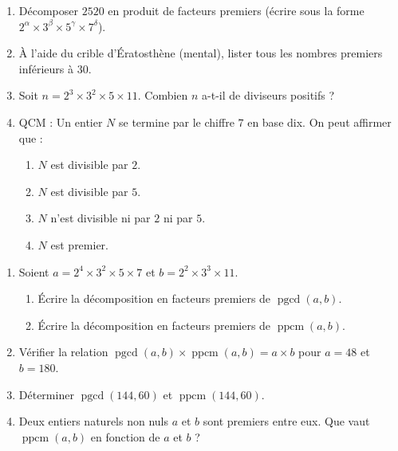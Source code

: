 \documentclass[11pt]{article}
\begin{document}
\begin{exercice}
\begin{enumerate}
    \item Décomposer $2520$ en produit de facteurs premiers (écrire sous la forme $2^\alpha \times 3^\beta \times 5^\gamma \times 7^\delta$).
    \item À l'aide du crible d'Ératosthène (mental), lister tous les nombres premiers inférieurs à $30$.
    \item Soit $n = 2^3 \times 3^2 \times 5 \times 11$. Combien $n$ a-t-il de diviseurs positifs ?
    \item QCM : Un entier $N$ se termine par le chiffre $7$ en base dix. On peut affirmer que :
    \begin{enumerate}
        \item $N$ est divisible par $2$.
        \item $N$ est divisible par $5$.
        \item $N$ n'est divisible ni par $2$ ni par $5$.
        \item $N$ est premier.
    \end{enumerate}
\end{enumerate}
\end{exercice}

\begin{exercice}
\begin{enumerate}
    \item Soient $a = 2^4 \times 3^2 \times 5 \times 7$ et $b = 2^2 \times 3^3 \times 11$.
    \begin{enumerate}
        \item Écrire la décomposition en facteurs premiers de $\operatorname{pgcd}(a,b)$.
        \item Écrire la décomposition en facteurs premiers de $\operatorname{ppcm}(a,b)$.
    \end{enumerate}
    \item Vérifier la relation $\operatorname{pgcd}(a,b) \times \operatorname{ppcm}(a,b) = a \times b$ pour $a=48$ et $b=180$.
    \item Déterminer $\operatorname{pgcd}(144, 60)$ et $\operatorname{ppcm}(144, 60)$.
    \item Deux entiers naturels non nuls $a$ et $b$ sont premiers entre eux. Que vaut $\operatorname{ppcm}(a,b)$ en fonction de $a$ et $b$ ?
\end{enumerate}
\end{exercice}
\end{document}
